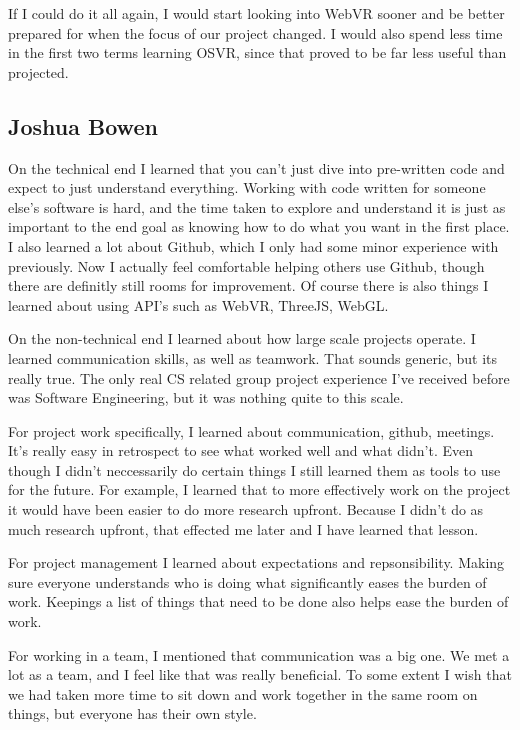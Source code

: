 \documentclass[draftclsnofoot,onecolumn]{IEEEtran}
\begin{document}
If I could do it all again, I would start looking into WebVR sooner and be better prepared for when the focus of our project changed. 
I would also spend less time in the first two terms learning OSVR, since that proved to be far less useful than projected.  

\subsection{Joshua Bowen}

On the technical end I learned that you can't just dive into pre-written code and expect to just understand everything.
Working with code written for someone else's software is hard, and the time taken to explore and understand it is just as important to the end goal as knowing how to do what you want in the first place.
I also learned a lot about Github, which I only had some minor experience with previously.
Now I actually feel comfortable helping others use Github, though there are definitly still rooms for improvement.
Of course there is also things I learned about using API's such as WebVR, ThreeJS, WebGL.

On the non-technical end I learned about how large scale projects operate.
I learned communication skills, as well as teamwork.
That sounds generic, but its really true.
The only real CS related group project experience I've received before was Software Engineering, but it was nothing quite to this scale.

For project work specifically, I learned about communication, github, meetings.
It's really easy in retrospect to see what worked well and what didn't. 
Even though I didn't neccessarily do certain things I still learned them as tools to use for the future.
For example, I learned that to more effectively work on the project it would have been easier to do more research upfront. 
Because I didn't do as much research upfront, that effected me later and I have learned that lesson.

For project management I learned about expectations and repsonsibility.
Making sure everyone understands who is doing what significantly eases the burden of work.
Keepings a list of things that need to be done also helps ease the burden of work.

For working in a team, I mentioned that communication was a big one.
We met a lot as a team, and I feel like that was really beneficial.
To some extent I wish that we had taken more time to sit down and work together in the same room on things, but everyone has their own style.
\end{document}
